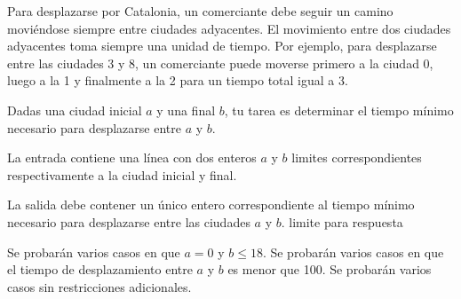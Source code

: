 \documentclass{oci}
\newcommand{\todo}[1]{{\color{red} #1}}
\begin{document}
\begin{problemDescription}
Para desplazarse por Catalonia, un comerciante debe seguir un camino moviéndose
siempre entre ciudades adyacentes.
El movimiento entre dos ciudades adyacentes toma siempre una unidad de tiempo.
Por ejemplo, para desplazarse entre las ciudades 3 y 8, un comerciante puede moverse primero
a la ciudad 0, luego a la 1 y finalmente a la 2 para un tiempo total igual a 3.

Dadas una ciudad inicial $a$ y una final $b$, tu tarea es determinar el tiempo mínimo
necesario para desplazarse entre $a$ y $b$.
\end{problemDescription}

\begin{inputDescription}
    La entrada contiene una línea con dos enteros $a$ y $b$ \todo{limites} correspondientes respectivamente
    a la ciudad inicial y final.
\end{inputDescription}

\begin{outputDescription}
    La salida debe contener un único entero correspondiente al tiempo mínimo necesario
    para desplazarse entre las ciudades $a$ y $b$. \todo{limite para respuesta}
\end{outputDescription}

\begin{scoreDescription}
  Se probarán varios casos en que $a = 0$ y $b \leq 18$.
  Se probarán varios casos en que el tiempo de desplazamiento entre $a$ y $b$ es menor que 100.
  Se probarán varios casos sin restricciones adicionales.
\end{scoreDescription}

\begin{sampleDescription}
\end{sampleDescription}
\end{document}

